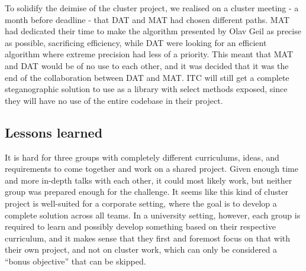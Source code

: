 To solidify the deimise of the cluster project, we realised on a cluster meeting - a month before deadline - that DAT and MAT had chosen different paths.
MAT had dedicated their time to make the algorithm presented by Olav Geil as precise as possible, sacrificing efficiency, while DAT were looking for an efficient algorithm where extreme precision had less of a priority.
This meant that MAT and DAT would be of no use to each other, and it was decided that it was the end of the collaboration between DAT and MAT.
ITC will still get a complete steganographic solution to use as a library with select methods exposed, since they will have no use of the entire codebase in their project.

\subsection*{Lessons learned}
It is hard for three groups with completely different curriculums, ideas, and requirements to come together and work on a shared project.
Given enough time and more in-depth talks with each other, it could most likely work, but neither group was prepared enough for the challenge.
It seems like this kind of cluster project is well-suited for a corporate setting, where the goal is to develop a complete solution across all teams.
In a university setting, however, each group is required to learn and possibly develop something based on their respective curriculum, and it makes sense that they first and foremost focus on that with their own project, and not on cluster work, which can only be considered a ``bonus objective'' that can be skipped.

